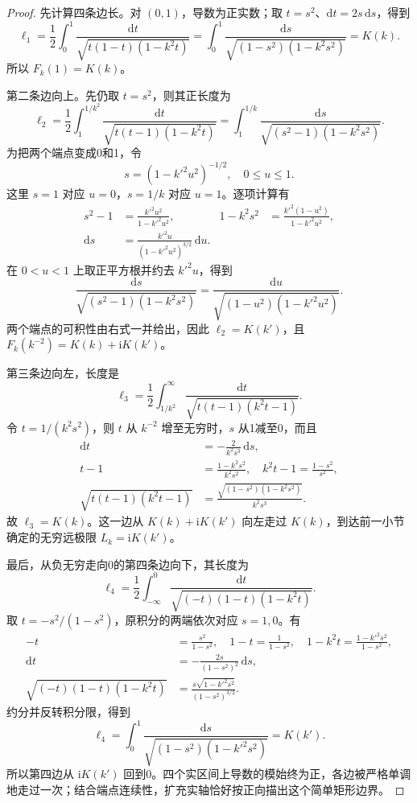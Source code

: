 \begin{proof}
先计算四条边长。对 \((0,1)\)，导数为正实数；取 \(t=s^2\)、\(\mathrm{d}t=2s\,\mathrm{d}s\)，得到
\[
 \ell_1=\frac12\int_0^1
 \frac{\mathrm{d}t}{\sqrt{t(1-t)(1-k^2t)}}
 =\int_0^1\frac{\mathrm{d}s}
 {\sqrt{(1-s^2)(1-k^2s^2)}}=K(k).
\]
所以 \(F_k(1)=K(k)\)。

第二条边向上。先仍取 \(t=s^2\)，则其正长度为
\[
 \ell_2=\frac12\int_1^{1/k^2}
 \frac{\mathrm{d}t}{\sqrt{t(t-1)(1-k^2t)}}
 =\int_1^{1/k}\frac{\mathrm{d}s}
 {\sqrt{(s^2-1)(1-k^2s^2)}}.
\]
为把两个端点变成0和1，令
\[
 s=(1-k'^2u^2)^{-1/2},\quad 0\le u\le1.
\]
这里 \(s=1\) 对应 \(u=0\)，\(s=1/k\) 对应 \(u=1\)。逐项计算有
\[
 \begin{aligned}
 s^2-1&=\frac{k'^2u^2}{1-k'^2u^2},&
 1-k^2s^2&=\frac{k'^2(1-u^2)}{1-k'^2u^2},\\
 \mathrm{d}s&=\frac{k'^2u}{(1-k'^2u^2)^{3/2}}\,\mathrm{d}u.
 \end{aligned}
\]
在 \(0<u<1\) 上取正平方根并约去 \(k'^2u\)，得到
\[
 \frac{\mathrm{d}s}{\sqrt{(s^2-1)(1-k^2s^2)}}
 =\frac{\mathrm{d}u}{\sqrt{(1-u^2)(1-k'^2u^2)}}.
\]
两个端点的可积性由右式一并给出，因此 \(\ell_2=K(k')\)，且
\(F_k(k^{-2})=K(k)+\mathrm{i}K(k')\)。

第三条边向左，长度是
\[
 \ell_3=\frac12\int_{1/k^2}^{\infty}
 \frac{\mathrm{d}t}{\sqrt{t(t-1)(k^2t-1)}}.
\]
令 \(t=1/(k^2s^2)\)，则 \(t\) 从 \(k^{-2}\) 增至无穷时，\(s\) 从1减至0，而且
\[
 \begin{aligned}
 \mathrm{d}t&=-\frac{2}{k^2s^3}\,\mathrm{d}s,\\
 t-1&=\frac{1-k^2s^2}{k^2s^2},\quad
 k^2t-1=\frac{1-s^2}{s^2},\\
 \sqrt{t(t-1)(k^2t-1)}
 &=\frac{\sqrt{(1-s^2)(1-k^2s^2)}}{k^2s^3}.
 \end{aligned}
\]
故 \(\ell_3=K(k)\)。这一边从 \(K(k)+\mathrm{i}K(k')\) 向左走过 \(K(k)\)，到达前一小节确定的无穷远极限
\(L_k=\mathrm{i}K(k')\)。

最后，从负无穷走向0的第四条边向下，其长度为
\[
 \ell_4=\frac12\int_{-\infty}^0
 \frac{\mathrm{d}t}{\sqrt{(-t)(1-t)(1-k^2t)}}.
\]
取 \(t=-s^2/(1-s^2)\)，原积分的两端依次对应 \(s=1,0\)。有
\[
 \begin{aligned}
 -t&=\frac{s^2}{1-s^2},\quad
 1-t=\frac1{1-s^2},\quad
 1-k^2t=\frac{1-k'^2s^2}{1-s^2},\\
 \mathrm{d}t&=-\frac{2s}{(1-s^2)^2}\,\mathrm{d}s,\\
 \sqrt{(-t)(1-t)(1-k^2t)}
 &=\frac{s\sqrt{1-k'^2s^2}}{(1-s^2)^{3/2}}.
 \end{aligned}
\]
约分并反转积分限，得到
\[
 \ell_4=\int_0^1\frac{\mathrm{d}s}
 {\sqrt{(1-s^2)(1-k'^2s^2)}}=K(k').
\]
所以第四边从 \(\mathrm{i}K(k')\) 回到0。四个实区间上导数的模始终为正，各边被严格单调地走过一次；结合端点连续性，扩充实轴恰好按正向描出这个简单矩形边界。


\end{proof}
